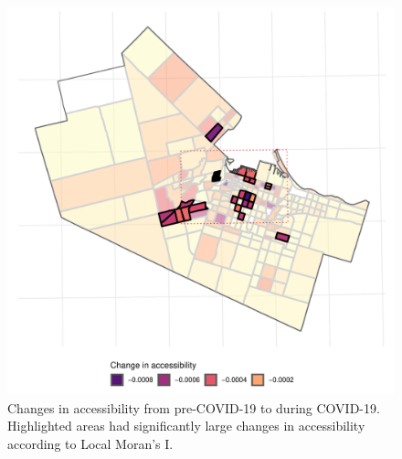 \documentclass[]{elsarticle} %
\providecommand{\DIFaddend}{} %
\providecommand{\DIFaddbeginFL}{} %
\providecommand{\DIFaddendFL}{} %
\providecommand{\DIFdelbeginFL}{} %
\providecommand{\DIFdelendFL}{} %
\newcommand{\DIFscaledelfig}{0.5}
\newlength{\DIFdelgraphicswidth} %
\newlength{\DIFdelgraphicsheight} %
\newcommand{\DIFaddincludegraphics}[2][]{{\color{blue}\fbox{\DIFOincludegraphics[#1]{#2}}}} %
\newcommand{\DIFdelincludegraphics}[2][]{%
\sbox{\DIFdelgraphicsbox}{\DIFOincludegraphics[#1]{#2}}%
\settoboxwidth{\DIFdelgraphicswidth}{\DIFdelgraphicsbox} %
\settoboxtotalheight{\DIFdelgraphicsheight}{\DIFdelgraphicsbox} %
\scalebox{\DIFscaledelfig}{%
\parbox[b]{\DIFdelgraphicswidth}{\usebox{\DIFdelgraphicsbox}\\[-\baselineskip] \rule{\DIFdelgraphicswidth}{0em}}\llap{\resizebox{\DIFdelgraphicswidth}{\DIFdelgraphicsheight}{%
\setlength{\unitlength}{\DIFdelgraphicswidth}%
\begin{picture}(1,1)%
\thicklines\linethickness{2pt} %
{\color[rgb]{1,0,0}\put(0,0){\framebox(1,1){}}}%
{\color[rgb]{1,0,0}\put(0,0){\line( 1,1){1}}}%
{\color[rgb]{1,0,0}\put(0,1){\line(1,-1){1}}}%
\end{picture}%
}\hspace*{3pt}}} %
} %
\DeclareRobustCommand{\DIFaddend}{\DIFOaddend \let\includegraphics\DIFOincludegraphics} %
\DeclareRobustCommand{\DIFaddbeginFL}{\DIFOaddbeginFL \let\includegraphics\DIFaddincludegraphics} %
\DeclareRobustCommand{\DIFaddendFL}{\DIFOaddendFL \let\includegraphics\DIFOincludegraphics} %
\DeclareRobustCommand{\DIFdelbeginFL}{\DIFOdelbeginFL \let\includegraphics\DIFdelincludegraphics} %
\DeclareRobustCommand{\DIFdelendFL}{\DIFOaddendFL \let\includegraphics\DIFOincludegraphics} %
\begin{document}
\DIFaddend \begin{figure}
\DIFdelbeginFL %
\DIFdelendFL \DIFaddbeginFL \includegraphics[width=1\linewidth]{Accessibility-Foodbanks-Hamilton_files/figure-latex/plot-local-i-1} \DIFaddendFL \caption{\label{fig:accessibility-changes-with-local-i}Changes in accessibility from pre-COVID-19 to during COVID-19. Highlighted areas had significantly large changes in accessibility according to Local Moran's I.}\label{fig:plot-local-i}
\end{figure}
\end{document}
